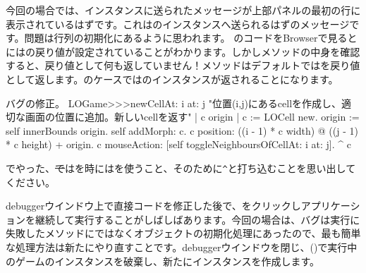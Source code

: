 \documentclass[a4paper,10pt,twoside]{book}
\begin{document}
今回の場合では、インスタンスに送られたメッセージが上部パネルの最初の行に表示されているはずです。これはのインスタンスへ送られるはずのメッセージです。問題は行列の初期化にあるように思われます。
のコードをBrowserで見るとにはの戻り値が設定されていることがわかります。しかしメソッドの中身を確認すると、戻り値として何も返していません！メソッドはデフォルトではを戻り値として返します。のケースではのインスタンスが返されることになります。

\dothis{debuggerウインドウを閉じで下さい。
その後、\ct{c}を返すために``\ct{^ c}''式を \ct{LOGame>>>newCellAt:at:}メソッドの最後に追加して下さい。
(\mthref{newCellAt:at:nobug}参照。)}

\begin{method}{バグの修正。}
LOGame>>>newCellAt: i at: j
   "位置(i,j)にあるcellを作成し、適切な画面の位置に追加。新しいcellを返す"
   | c origin |
   c := LOCell new.
   origin := self innerBounds origin.
   self addMorph: c.
   c position: ((i - 1) * c width) @ ((j - 1) * c height) + origin.
   c mouseAction: [self toggleNeighboursOfCellAt: i at: j].
   ^ c
\end{method}

\noindent
{}でやった、\st ではを時には\ct{^}を使うこと、そのために\verb|^|と打ち込むことを思い出してください。

debuggerウインドウ上で直接コードを修正した後で、をクリックしアプリケーションを継続して実行することがしばしばあります。今回の場合は、バグは実行に失敗したメソッドにではなくオブジェクトの初期化処理にあったので、最も簡単な処理方法は新たにやり直すことです。debuggerウインドウを閉じ、()で実行中のゲームのインスタンスを破棄し、新たにインスタンスを作成します。


\end{document}
